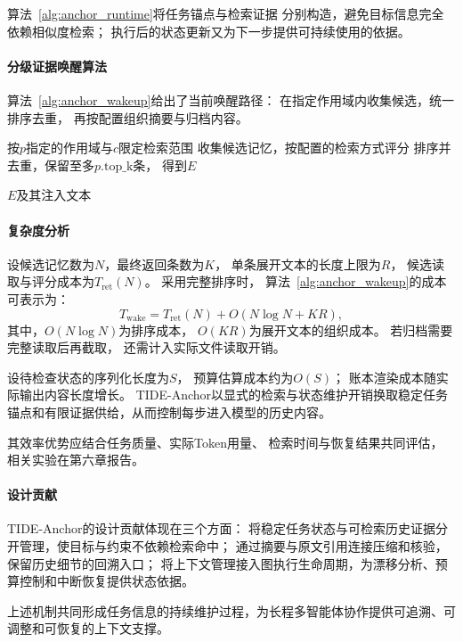 算法~\ref{alg:anchor_runtime}将任务锚点与检索证据
分别构造，避免目标信息完全依赖相似度检索；
执行后的状态更新又为下一步提供可持续使用的依据。

\paragraph{分级证据唤醒算法}

算法~\ref{alg:anchor_wakeup}给出了当前唤醒路径：
在指定作用域内收集候选，统一排序去重，
再按配置组织摘要与归档内容。

\begin{algorithm}[htbp]
    \caption{分级证据唤醒}
    \label{alg:anchor_wakeup}

    按$p$指定的作用域与$c$限定检索范围\;
    收集候选记忆，按配置的检索方式评分\;
    排序并去重，保留至多$p.\mathrm{top\_k}$条，
    得到$E$\;


    \Return $E$及其注入文本\;
\end{algorithm}

\paragraph{复杂度分析}

设候选记忆数为$N$，最终返回条数为$K$，
单条展开文本的长度上限为$R$，
候选读取与评分成本为$T_{\mathrm{ret}}(N)$。
采用完整排序时，
算法~\ref{alg:anchor_wakeup}的成本可表示为：
\begin{equation}
    T_{\mathrm{wake}}
    =
    T_{\mathrm{ret}}(N)
    +
    O(N\log N+KR),
    \label{eq:anchor_wakeup_cost}
\end{equation}
其中，$O(N\log N)$为排序成本，
$O(KR)$为展开文本的组织成本。
若归档需要完整读取后再截取，
还需计入实际文件读取开销。

设待检查状态的序列化长度为$S$，
预算估算成本约为$O(S)$；
账本渲染成本随实际输出内容长度增长。
TIDE-Anchor以显式的检索与状态维护开销换取稳定任务锚点和有限证据供给，从而控制每步进入模型的历史内容。

其效率优势应结合任务质量、实际Token用量、
检索时间与恢复结果共同评估，
相关实验在第六章报告。


\paragraph{设计贡献}

TIDE-Anchor的设计贡献体现在三个方面：
将稳定任务状态与可检索历史证据分开管理，使目标与约束不依赖检索命中；
通过摘要与原文引用连接压缩和核验，保留历史细节的回溯入口；
将上下文管理接入图执行生命周期，为漂移分析、预算控制和中断恢复提供状态依据。

上述机制共同形成任务信息的持续维护过程，为长程多智能体协作提供可追溯、可调整和可恢复的上下文支撑。


